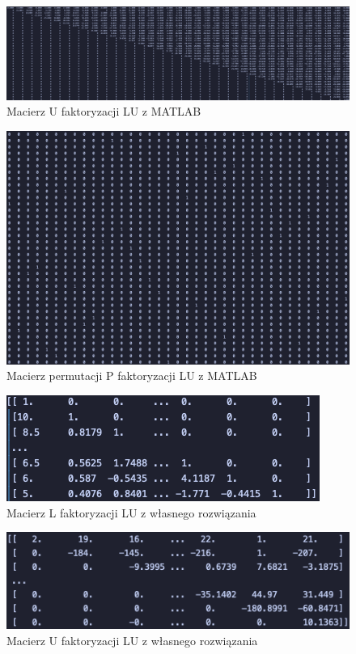 \documentclass{article}
\begin{document}
\begin{figure}[htbp]
  \centering
  \includegraphics[width=\linewidth]{u_matlab.png}
  \caption{Macierz U faktoryzacji LU z MATLAB}
  \label{fig:u_matlab}
\end{figure}

\begin{figure}[H]
  \centering
  \includegraphics[width=\linewidth]{p_matlab.png}
  \caption{Macierz permutacji P faktoryzacji LU z MATLAB}
  \label{fig:p_matlab}
\end{figure}

\begin{figure}[htbp]
  \centering
  \includegraphics[width=\linewidth]{l_python1.png}
  \caption{Macierz L faktoryzacji LU z własnego rozwiązania}
  \label{fig:l_python1}
\end{figure}

\begin{figure}[H]
  \centering
  \includegraphics[width=\linewidth]{u_python1.png}
  \caption{Macierz U faktoryzacji LU z własnego rozwiązania}
  \label{fig:u_python1}
\end{figure}
\end{document}
